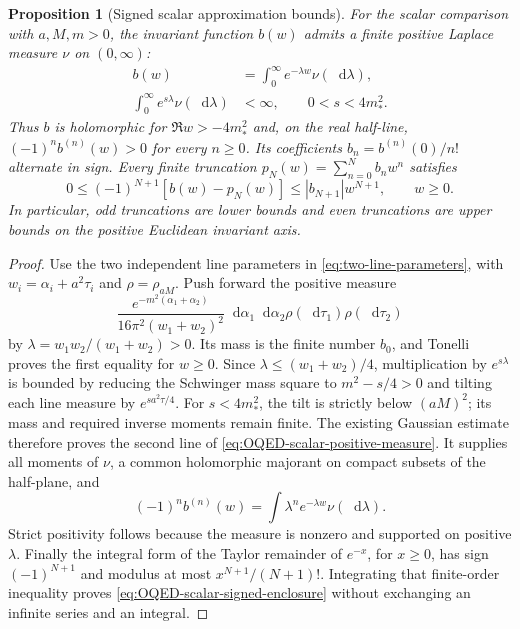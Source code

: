 \documentclass[final,5p,times,twocolumn,numbers,nopreprintline]{elsarticle}
\numberwithin{equation}{section}
\newtheorem{proposition}[theorem]{Proposition}
\theoremstyle{definition}
\theoremstyle{remark}
\newcommand{\dd}{\mathop{}\!\mathrm d}
\begin{document}
\begin{proposition}[Signed scalar approximation bounds]
\label{prop:OQED-scalar-CM-enclosure}
For the scalar comparison with \(a,M,m>0\), the invariant function
\(b(w)\) admits a finite positive Laplace measure \(\nu\) on
\((0,\infty)\):
\begin{equation}
 \begin{aligned}
  b(w)&=\int_0^\infty e^{-\lambda w}\nu(\dd\lambda),\\
  \int_0^\infty e^{s\lambda}\nu(\dd\lambda)&<\infty,
       \qquad 0<s<4m_*^2.
 \end{aligned}
 \label{eq:OQED-scalar-positive-measure}
\end{equation}
Thus \(b\) is holomorphic for \(\Re w>-4m_*^2\) and, on the
real half-line, \((-1)^n b^{(n)}(w)>0\) for every \(n\geq0\).
Its coefficients \(b_n=b^{(n)}(0)/n!\) alternate in sign. Every
finite truncation \(p_N(w)=\sum_{n=0}^N b_nw^n\) satisfies
\begin{equation}
 0\leq(-1)^{N+1}[b(w)-p_N(w)]
       \leq |b_{N+1}|w^{N+1},\qquad w\geq0.
 \label{eq:OQED-scalar-signed-enclosure}
\end{equation}
In particular, odd truncations are lower bounds and even truncations
are upper bounds on the positive Euclidean invariant axis.
\end{proposition}
\begin{proof}
Use the two independent line parameters in
\eqref{eq:two-line-parameters}, with \(w_i=\alpha_i+a^2\tau_i\)
and \(\rho=\rho_{aM}\). Push forward the positive measure
\[
 \frac{e^{-m^2(\alpha_1+\alpha_2)}}{16\pi^2(w_1+w_2)^2}
 \dd\alpha_1\dd\alpha_2\rho(\dd\tau_1)\rho(\dd\tau_2)
\]
by \(\lambda=w_1w_2/(w_1+w_2)>0\). Its mass is the finite
number \(b_0\), and Tonelli proves the first equality for \(w\geq0\).
Since \(\lambda\leq(w_1+w_2)/4\), multiplication by
\(e^{s\lambda}\) is bounded by reducing the Schwinger mass square
to \(m^2-s/4>0\) and tilting each line measure by
\(e^{sa^2\tau/4}\). For \(s<4m_*^2\), the tilt is strictly
below \((aM)^2\); its mass and required inverse moments remain
finite. The existing Gaussian estimate therefore proves the second
line of \eqref{eq:OQED-scalar-positive-measure}. It supplies all
moments of \(\nu\), a common holomorphic majorant on compact
subsets of the half-plane, and
\[
 (-1)^n b^{(n)}(w)=\int\lambda^n e^{-\lambda w}\nu(\dd\lambda).
\]
Strict positivity follows because the measure is nonzero and supported
on positive \(\lambda\). Finally the integral form of the Taylor
remainder of \(e^{-x}\), for \(x\geq0\), has sign
\((-1)^{N+1}\) and modulus at most \(x^{N+1}/(N+1)!\).
Integrating that finite-order inequality proves
\eqref{eq:OQED-scalar-signed-enclosure} without exchanging an
infinite series and an integral.
\end{proof}
\end{document}
